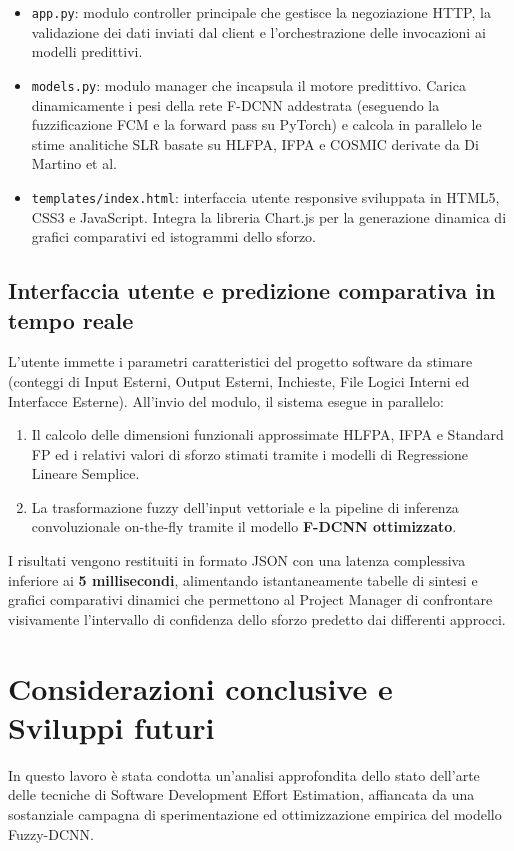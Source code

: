 \documentclass[11pt, a4paper]{article}
\begin{document}
\begin{itemize}
    \item \texttt{app.py}: modulo controller principale che gestisce la negoziazione HTTP, la validazione dei dati inviati dal client e l'orchestrazione delle invocazioni ai modelli predittivi.
    \item \texttt{models.py}: modulo manager che incapsula il motore predittivo. Carica dinamicamente i pesi della rete F-DCNN addestrata (eseguendo la fuzzificazione FCM e la forward pass su PyTorch) e calcola in parallelo le stime analitiche SLR basate su HLFPA, IFPA e COSMIC derivate da Di Martino et al.
    \item \texttt{templates/index.html}: interfaccia utente responsive sviluppata in HTML5, CSS3 e JavaScript. Integra la libreria Chart.js per la generazione dinamica di grafici comparativi ed istogrammi dello sforzo.
\end{itemize}

\subsection{Interfaccia utente e predizione comparativa in tempo reale}
L'utente immette i parametri caratteristici del progetto software da stimare (conteggi di Input Esterni, Output Esterni, Inchieste, File Logici Interni ed Interfacce Esterne). All'invio del modulo, il sistema esegue in parallelo:
\begin{enumerate}
    \item Il calcolo delle dimensioni funzionali approssimate HLFPA, IFPA e Standard FP ed i relativi valori di sforzo stimati tramite i modelli di Regressione Lineare Semplice.
    \item La trasformazione fuzzy dell'input vettoriale e la pipeline di inferenza convoluzionale on-the-fly tramite il modello \textbf{F-DCNN ottimizzato}.
\end{enumerate}
I risultati vengono restituiti in formato JSON con una latenza complessiva inferiore ai \textbf{5 millisecondi}, alimentando istantaneamente tabelle di sintesi e grafici comparativi dinamici che permettono al Project Manager di confrontare visivamente l'intervallo di confidenza dello sforzo predetto dai differenti approcci.

\section{Considerazioni conclusive e Sviluppi futuri}\label{sec:conclusioni}
In questo lavoro è stata condotta un'analisi approfondita dello stato dell'arte delle tecniche di Software Development Effort Estimation, affiancata da una sostanziale campagna di sperimentazione ed ottimizzazione empirica del modello Fuzzy-DCNN.
\end{document}

